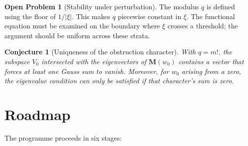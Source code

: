 \documentclass{article}
\newtheorem{conjecture}[theorem]{Conjecture}
\theoremstyle{definition}
\newtheorem{problem}[theorem]{Open Problem}
\begin{document}
\begin{problem}[Stability under perturbation]
The modulus \(q\) is defined using the floor of \(1/|\xi|\). This makes \(q\) piecewise constant in \(\xi\). The functional equation must be examined on the boundary where \(\xi\) crosses a threshold; the argument should be uniform across these strata.
\end{problem}

\begin{conjecture}[Uniqueness of the obstruction character]
With \(q = m!\), the subspace \(V_0\) intersected with the eigenvectors of \(\mathbf{M}(w_0)\) contains a vector that forces at least one Gauss sum to vanish. Moreover, for \(w_0\) arising from a zero, the eigenvalue condition can only be satisfied if that character's sum is zero.
\end{conjecture}

\section{Roadmap}

The programme proceeds in six stages:
\end{document}
